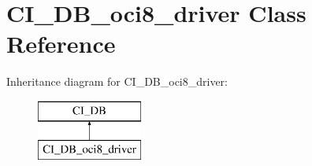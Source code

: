 \hypertarget{class_c_i___d_b__oci8__driver}{\section{C\-I\-\_\-\-D\-B\-\_\-oci8\-\_\-driver Class Reference}
\label{class_c_i___d_b__oci8__driver}
}
Inheritance diagram for C\-I\-\_\-\-D\-B\-\_\-oci8\-\_\-driver\-:\begin{figure}[H]
\begin{center}
\leavevmode
\includegraphics[height=2.000000cm]{class_c_i___d_b__oci8__driver}
\end{center}
\end{figure}
